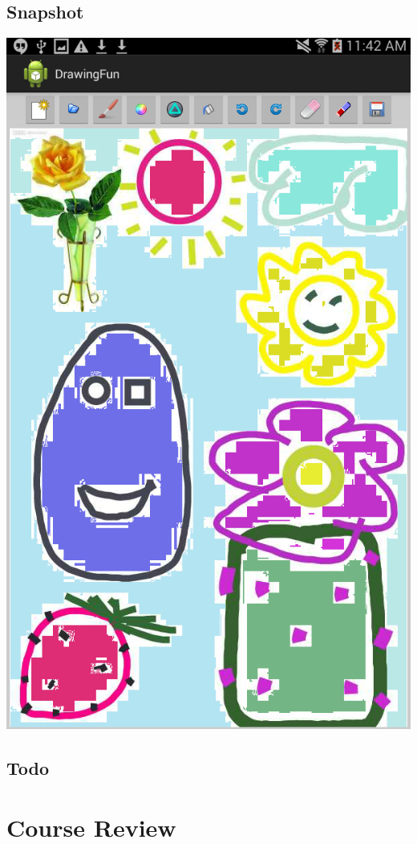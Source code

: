 \documentclass[9pt,b5paper]{article}
\begin{document}
\subsection{Snapshot}
\label{sec-6-3}
\includegraphics[width=.9\linewidth]{./Screenshot_2014-12-08-11-42-04.png}
\subsection{Todo}
\label{sec-6-4}

\section{Course Review}
\label{sec-7}
\end{document}
